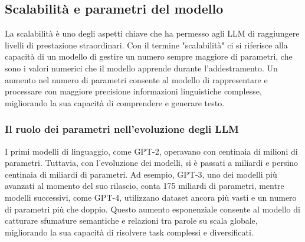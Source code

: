 \documentclass[target=mst,aauheader=,style=]{thud}
\begin{document}
\subsection{Scalabilità e parametri del modello}
La scalabilità è uno degli aspetti chiave che ha permesso agli LLM di raggiungere livelli di prestazione straordinari. Con il termine "scalabilità" ci si riferisce alla capacità di un modello di gestire un numero sempre maggiore di parametri, che sono i valori numerici che il modello apprende durante l’addestramento. Un aumento nel numero di parametri consente al modello di rappresentare e processare con maggiore precisione informazioni linguistiche complesse, migliorando la sua capacità di comprendere e generare testo.

\subsubsection{Il ruolo dei parametri nell'evoluzione degli LLM}
I primi modelli di linguaggio, come GPT-2, operavano con centinaia di milioni di parametri. Tuttavia, con l’evoluzione dei modelli, si è passati a miliardi e persino centinaia di miliardi di parametri. Ad esempio, GPT-3, uno dei modelli più avanzati al momento del suo rilascio, conta 175 miliardi di parametri, mentre modelli successivi, come GPT-4, utilizzano dataset ancora più vasti e un numero di parametri più che doppio. Questo aumento esponenziale consente al modello di catturare sfumature semantiche e relazioni tra parole su scala globale, migliorando la sua capacità di risolvere task complessi e diversificati.
\end{document}
